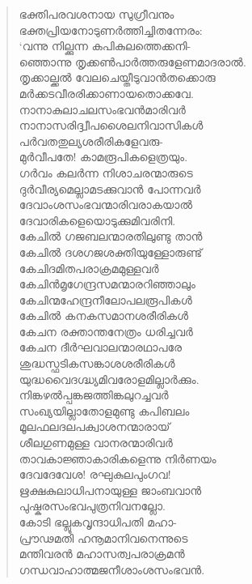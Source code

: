 \begin{verse}
ഭക്തിപരവശനായ സുഗ്രീവനും\\
ഭക്തപ്രിയനോടുണര്‍ത്തിച്ചിതന്നേരം:\\
‘വന്നു നില്ക്കുന്ന കപികുലത്തെക്കനി-\\
ഞ്ഞൊന്നു തൃക്കണ്‍പാര്‍ത്തരുളേണമാദരാല്‍.\\
തൃക്കാല്ക്കല്‍ വേലചെയ്തീടുവാന്‍തക്കൊരു\\
മര്‍ക്കടവീരരിക്കാണായതൊക്കവേ.\\
നാനാകുലാചലസംഭവന്‍മാരിവര്‍\\
നാനാസരിദ്ദ്വീപശൈലനിവാസികള്‍\\
പര്‍വതതുല്യശരീരികളേവരു-\\
മുര്‍വീപതേ! കാമരൂപികളെത്രയും.\\
ഗര്‍വം കലര്‍ന്ന നിശാചരന്മാരുടെ\\
ദുര്‍വീര്യമെല്ലാമടക്കുവാന്‍ പോന്നവര്‍\\
ദേവാംശസംഭവന്മാരിവരാകയാല്‍\\
ദേവാരികളെയൊടുക്കുമിവരിനി.\\
കേചില്‍ ഗജബലന്മാരതിലുണ്ടു താന്‍\\
കേചില്‍ ദശഗജശക്തിയുള്ളോരുണ്ട്\\
കേചിദമിതപരാക്രമമുള്ളവര്‍\\
കേചിന്‍മൃഗേന്ദ്രസമന്മാരറിഞ്ഞാലും\\
കേചിന്മഹേന്ദ്രനീലോപലരൂപികള്‍\\
കേചില്‍ കനകസമാനശരീരികള്‍\\
കേചന രക്താന്തനേത്രം ധരിച്ചവര്‍\\
കേചന ദീര്‍ഘവാലന്മാരഥാപരേ\\
ശുദ്ധസ്ഫടികസങ്കാശശരീരികള്‍\\
യുദ്ധവൈദഗ്ദ്ധ്യമിവരോളമില്ലാര്‍ക്കും.\\
നിങ്കഴല്‍പ്പങ്കജത്തിങ്കലുറച്ചവര്‍\\
സംഖ്യയില്ലാതോളമുണ്ടു കപിബലം\\
മൂലഫലദലപക്വാശനന്മാരായ്\\
ശീലഗുണമുള്ള വാനരന്മാരിവര്‍\\
താവകാജ്ഞാകാരികളെന്നു നിര്‍ണയം\\
ദേവദേവേശ! രഘുകുലപുംഗവ!\\
ഋക്ഷകുലാധിപനായുള്ള ജാംബവാന്‍\\
പുഷ്കരസംഭവപുത്രനിവനല്ലോ.\\
കോടി ഭല്ലൂകവൃന്ദാധിപതി മഹാ-\\
പ്രൗഢമതി ഹനൂമാനിവനെന്നുടെ\\
മന്തിവരന്‍ മഹാസത്വപരാക്രമന്‍\\
ഗന്ധവാഹാത്മജനീശാംശസംഭവന്‍.\\

\end{verse}
